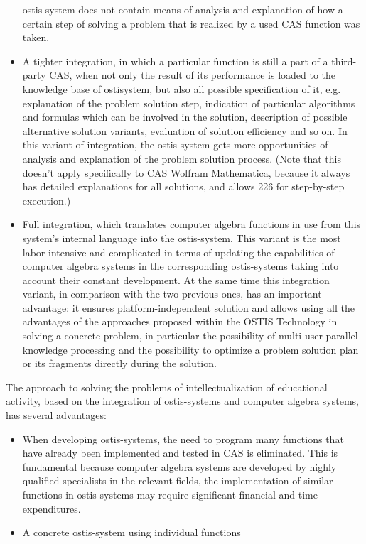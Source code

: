 \documentclass{article}
\begin{document}
\begin{multicols}{2}
\begin{itemize}
ostis-system does not contain means of analysis
and explanation of how a certain step of solving
a problem that is realized by a used CAS function
was taken.
\item A tighter integration, in which a particular function
is still a part of a third-party CAS, when not only the
result of its performance is loaded to the knowledge
base of ostisystem, but also all possible specification
of it, e.g. explanation of the problem solution step,
indication of particular algorithms and formulas
which can be involved in the solution, description
of possible alternative solution variants, evaluation
of solution efficiency and so on. In this variant of
integration, the ostis-system gets more opportunities
of analysis and explanation of the problem solution
process. (Note that this doesn’t apply specifically to
CAS Wolfram Mathematica, because it always has
detailed explanations for all solutions, and allows
226 for step-by-step execution.)
\item Full integration, which translates computer algebra functions in use from this system’s internal
language into the ostis-system. This variant is the
most labor-intensive and complicated in terms of
updating the capabilities of computer algebra systems in the corresponding ostis-systems taking into
account their constant development. At the same
time this integration variant, in comparison with
the two previous ones, has an important advantage:
it ensures platform-independent solution and allows
using all the advantages of the approaches proposed
within the OSTIS Technology in solving a concrete
problem, in particular the possibility of multi-user
parallel knowledge processing and the possibility to
optimize a problem solution plan or its fragments
directly during the solution.
\end{itemize} \par
The approach to solving the problems of intellectualization of educational activity, based on the integration of ostis-systems and computer algebra systems, has several
advantages:
\begin{itemize}
    \item When developing ostis-systems, the need to program many functions that have already been implemented and tested in CAS is eliminated. This
is fundamental because computer algebra systems
are developed by highly qualified specialists in
the relevant fields, the implementation of similar
functions in ostis-systems may require significant
financial and time expenditures.
\item A concrete ostis-system using individual functions

\end{itemize}
\end{multicols}
\end{document}
